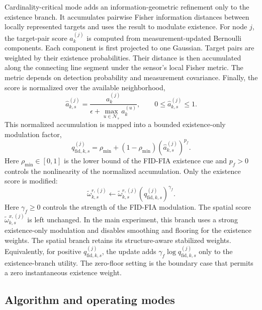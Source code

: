 Cardinality-critical mode adds an information-geometric refinement only to the existence branch. It accumulates pairwise Fisher information distances between locally represented targets and uses the result to modulate existence. For node $j$, the target-pair score $a_{k}^{(j)}$ is computed from measurement-updated Bernoulli components. Each component is first projected to one Gaussian. Target pairs are weighted by their existence probabilities. Their distance is then accumulated along the connecting line segment under the sensor's local Fisher metric. The metric depends on detection probability and measurement covariance. Finally, the score is normalized over the available neighborhood,
\begin{equation}
\label{eq:method-fid-normalization}
\hat{a}_{k,s}^{(j)}
=
\frac{a_{k}^{(j)}}{\epsilon + \max_{u\in\mathcal{N}_s} a_{k}^{(u)}} ,
\qquad
0 \leq \hat{a}_{k,s}^{(j)} \leq 1 .
\end{equation}
This normalized accumulation is mapped into a bounded existence-only modulation factor,
\begin{equation}
\label{eq:method-fid-cue}
q_{\mathrm{fid},k,s}^{(j)}
=
\rho_{\min}
+ (1-\rho_{\min})\left(\hat{a}_{k,s}^{(j)}\right)^{p_f}.
\end{equation}
Here $\rho_{\min}\in[0,1]$ is the lower bound of the FID-FIA existence cue and $p_f>0$ controls the nonlinearity of the normalized accumulation.
Only the existence score is modified:
\begin{equation}
\label{eq:method-fid-existence-modulation}
\tilde{\omega}_{k,s}^{r,(j)}
\leftarrow
\tilde{\omega}_{k,s}^{r,(j)}
\left(q_{\mathrm{fid},k,s}^{(j)}\right)^{\gamma_f}.
\end{equation}
Here $\gamma_f\ge0$ controls the strength of the FID-FIA modulation. The spatial score $\tilde{\omega}_{k,s}^{x,(j)}$ is left unchanged. In the main experiment, this branch uses a strong existence-only modulation and disables smoothing and flooring for the existence weights. The spatial branch retains its structure-aware stabilized weights.
Equivalently, for positive $q_{\mathrm{fid},k,s}^{(j)}$, the update adds $\gamma_f \log q_{\mathrm{fid},k,s}^{(j)}$ only to the existence-branch utility. The zero-floor setting is the boundary case that permits a zero instantaneous existence weight.

\subsection{Algorithm and operating modes}

